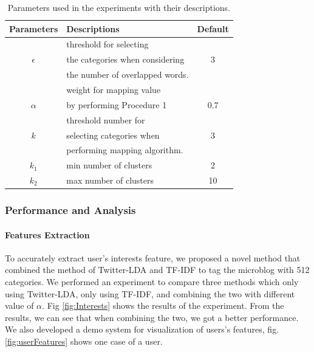 \begin{table}[!h]
\centering
    \caption{Parameters used in the experiments with their descriptions.  }
    \label{tab:Parameters}
    \begin{small}
    \begin{tabular}{|c|l|c|}
    \hline
    {\bfseries Parameters} & {\bfseries  Descriptions}                       & {\bfseries Default}     \\
    \hline
                       & threshold for selecting                             & \\
    $\epsilon$         & the categories when considering                     & 3\\
                       & the number of overlapped words.                     & \\
    \hline
                       & weight for mapping value                            & \\	
    $\alpha$           & by performing Procedure 1                           & 0.7\\
    \hline
                       & threshold number for                                & \\
    $k$                & selecting categories when                           & 3\\
                       & performing mapping algorithm.                       &	\\
    \hline
    $k_1$              & min number of clusters                              & 2	\\
    \hline
    $k_2$              & max number of clusters                              & 10	\\
    \hline
    \end{tabular}
    \end{small}
\end{table}


\subsubsection{Performance and Analysis}


\paragraph{Features Extraction}

To accurately extract user's interests feature, we proposed a novel method that combined the method of Twitter-LDA \cite{IEEEexample:zhao2011comparing} and TF-IDF to tag the microblog with 512 categories. We performed an experiment to compare three methods which only using Twitter-LDA, only using TF-IDF, and combining the two with different value of $\alpha$. Fig \ref{fig:Interests} shows the results of the experiment. From the results, we can see that when combining the two, we got a better performance. We also developed a demo system for visualization of users's features, fig. \ref{fig:userFeatures} shows one case of a user.

